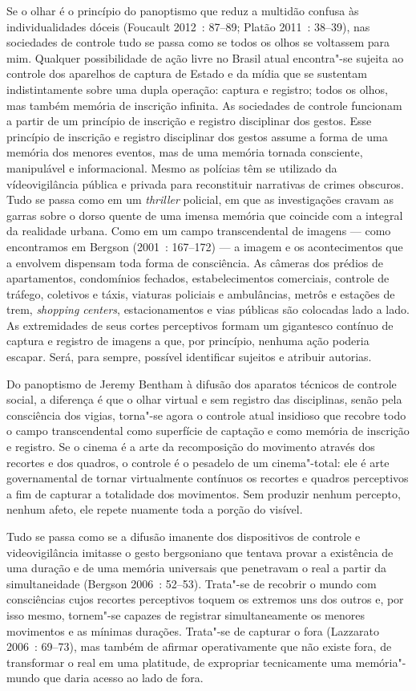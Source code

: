 Se o olhar é o princípio do panoptismo que reduz a multidão confusa às
individualidades dóceis (Foucault 2012~: 87--89; Platão 2011~: 38--39),
nas sociedades de controle tudo se passa como se todos os olhos se
voltassem para mim. Qualquer possibilidade de ação livre no Brasil atual
encontra"-se sujeita ao controle dos aparelhos de captura de Estado e da
mídia que se sustentam indistintamente sobre uma dupla operação: captura
e registro; todos os olhos, mas também memória de inscrição infinita. As
sociedades de controle funcionam a partir de um princípio de inscrição e
registro disciplinar dos gestos. Esse princípio de inscrição e registro
disciplinar dos gestos assume a forma de uma memória dos menores
eventos, mas de uma memória tornada consciente, manipulável e
informacional. Mesmo as polícias têm se utilizado da vídeovigilância
pública e privada para reconstituir narrativas de crimes obscuros. Tudo
se passa como em um \emph{thriller }policial, em que as investigações
cravam as garras sobre o dorso quente de uma imensa memória que coincide
com a integral da realidade urbana. Como em um campo transcendental de
imagens --- como encontramos em Bergson (2001~: 167--172) --- a imagem e os
acontecimentos que a envolvem dispensam toda forma de consciência. As
câmeras dos prédios de apartamentos, condomínios fechados,
estabelecimentos comerciais, controle de tráfego, coletivos e táxis,
viaturas policiais e ambulâncias, metrôs e estações de trem,
\emph{shopping centers}, estacionamentos e vias públicas são colocadas
lado a lado. As extremidades de seus cortes perceptivos formam um
gigantesco contínuo de captura e registro de imagens a que, por
princípio, nenhuma ação poderia escapar. Será, para sempre, possível
identificar sujeitos e atribuir autorias.

Do panoptismo de Jeremy Bentham à difusão dos aparatos técnicos de
controle social, a diferença é que o olhar virtual e sem registro das
disciplinas, senão pela consciência dos vigias, torna"-se agora o
controle atual insidioso que recobre todo o campo transcendental como
superfície de captação e como memória de inscrição e registro. Se o
cinema é a arte da recomposição do movimento através dos recortes e dos
quadros, o controle é o pesadelo de um cinema"-total: ele é arte
governamental de tornar virtualmente contínuos os recortes e quadros
perceptivos a fim de capturar a totalidade dos movimentos. Sem produzir
nenhum percepto, nenhum afeto, ele repete nuamente toda a porção do
visível.

Tudo se passa como se a difusão imanente dos dispositivos de controle e
videovigilância imitasse o gesto bergsoniano que tentava provar a
existência de uma duração e de uma memória universais que penetravam o
real a partir da simultaneidade (Bergson 2006~: 52--53). Trata"-se de
recobrir o mundo com consciências cujos recortes perceptivos toquem os
extremos uns dos outros e, por isso mesmo, tornem"-se capazes de
registrar simultaneamente os menores movimentos e as mínimas durações.
Trata"-se de capturar o fora (Lazzarato 2006~: 69--73), mas também de
afirmar operativamente que não existe fora, de transformar o real em uma
platitude, de expropriar tecnicamente uma memória"-mundo que daria acesso
ao lado de fora.

